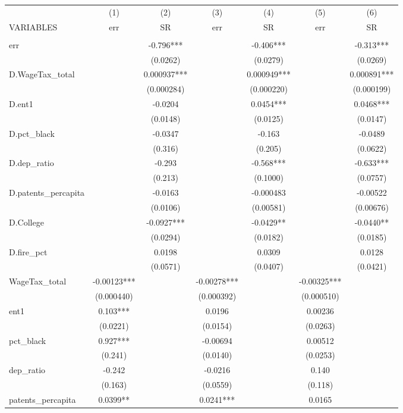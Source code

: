 \begin{tabular}{lcccccc} \hline
 & (1) & (2) & (3) & (4) & (5) & (6) \\
VARIABLES & err & SR & err & SR & err & SR \\ \hline
 &  &  &  &  &  &  \\
err &  & -0.796*** &  & -0.406*** &  & -0.313*** \\
 &  & (0.0262) &  & (0.0279) &  & (0.0269) \\
D.WageTax\_total &  & 0.000937*** &  & 0.000949*** &  & 0.000891*** \\
 &  & (0.000284) &  & (0.000220) &  & (0.000199) \\
D.ent1 &  & -0.0204 &  & 0.0454*** &  & 0.0468*** \\
 &  & (0.0148) &  & (0.0125) &  & (0.0147) \\
D.pct\_black &  & -0.0347 &  & -0.163 &  & -0.0489 \\
 &  & (0.316) &  & (0.205) &  & (0.0622) \\
D.dep\_ratio &  & -0.293 &  & -0.568*** &  & -0.633*** \\
 &  & (0.213) &  & (0.1000) &  & (0.0757) \\
D.patents\_percapita &  & -0.0163 &  & -0.000483 &  & -0.00522 \\
 &  & (0.0106) &  & (0.00581) &  & (0.00676) \\
D.College &  & -0.0927*** &  & -0.0429** &  & -0.0440** \\
 &  & (0.0294) &  & (0.0182) &  & (0.0185) \\
D.fire\_pct &  & 0.0198 &  & 0.0309 &  & 0.0128 \\
 &  & (0.0571) &  & (0.0407) &  & (0.0421) \\
WageTax\_total & -0.00123*** &  & -0.00278*** &  & -0.00325*** &  \\
 & (0.000440) &  & (0.000392) &  & (0.000510) &  \\
ent1 & 0.103*** &  & 0.0196 &  & 0.00236 &  \\
 & (0.0221) &  & (0.0154) &  & (0.0263) &  \\
pct\_black & 0.927*** &  & -0.00694 &  & 0.00512 &  \\
 & (0.241) &  & (0.0140) &  & (0.0253) &  \\
dep\_ratio & -0.242 &  & -0.0216 &  & 0.140 &  \\
 & (0.163) &  & (0.0559) &  & (0.118) &  \\
patents\_percapita & 0.0399** &  & 0.0241*** &  & 0.0165 &  \\

\end{tabular}
